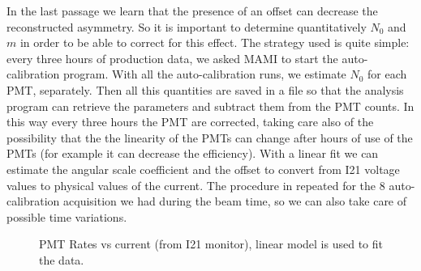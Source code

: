 In the last passage we learn that the presence of an offset can decrease the reconstructed asymmetry. So it is important to determine quantitatively $N_{0}$ and $m$ in order to be able to correct for this effect. The strategy used is quite simple: every three hours of production data, we asked MAMI to start the auto-calibration program. With all the auto-calibration runs, we estimate $N_{0}$ for each PMT, separately. Then all this quantities are saved in a file so that the analysis program can retrieve the parameters and subtract them from the PMT counts.
In this way every three hours the PMT are corrected, taking care also of the possibility that the the linearity of the PMTs can change after hours of use of the PMTs (for example it can decrease the efficiency). With a linear fit we can estimate the angular scale coefficient and the offset to convert from I21 voltage values to physical values of the current. The procedure in repeated for the $8$ auto-calibration acquisition we had during the beam time, so we can also take care of possible time variations.

\begin{figure}[!hbtp]
\centering
{}
\caption{PMT Rates vs current (from I21 monitor), linear model is used to fit the data.} 
\label{fig:AutocalibFit}
\end{figure}


